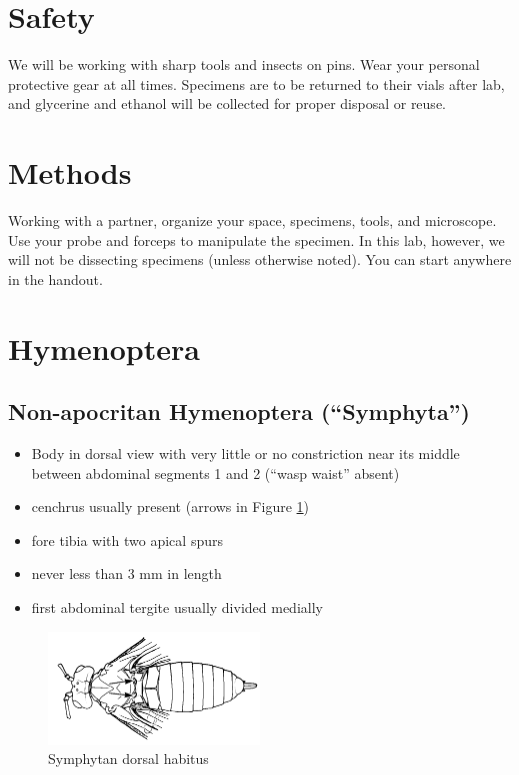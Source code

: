 \documentclass[letterpaper, 11pt]{article}
\begin{document}
\section*{Safety}
We will be working with sharp tools and insects on pins. Wear your personal protective gear at all times. Specimens are to be returned to their vials after lab, and glycerine and ethanol will be collected for proper disposal or reuse.

\section*{Methods}
Working with a partner, organize your space, specimens, tools, and microscope. Use your probe and forceps to manipulate the specimen. In this lab, however, we will not be dissecting specimens (unless otherwise noted). You can start anywhere in the handout.

\section{Hymenoptera}
\subsection{Non-apocritan Hymenoptera (``Symphyta'')}
\begin{itemize}
\item Body in dorsal view with very little or no constriction near its middle between abdominal segments 1 and 2 (“wasp waist” absent)
\item cenchrus usually present (arrows in Figure \ref{fig:symphyt1})
\item fore tibia with two apical spurs
\item never less than 3 mm in length
\item first abdominal tergite usually divided medially
\end{itemize}

\begin{figure}[ht!]
  \centering
    \includegraphics[width=0.5\textwidth]{SymphytaHabitus}
  \caption{Symphytan dorsal habitus \citep[][pg. 42]{goulet1993hymenoptera}}
  \label{fig:symphyt1}
\end{figure}
\end{document}
